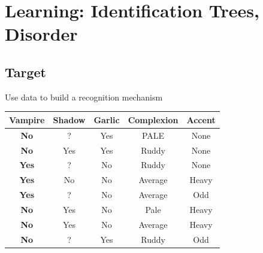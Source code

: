 \documentclass[12pt]{book}
\begin{document}
\section{Learning: Identification Trees, Disorder}
\subsection{Target}
Use data to build a recognition mechanism
\begin{table}[ht]
	\centering
	\begin{tabular}{|c|c|c|c|c|}
		\hline
		\rowcolor[HTML]{C0C0C0} 
		{\color[HTML]{000000} \textbf{Vampire}} & {\color[HTML]{000000} \textbf{Shadow}} & {\color[HTML]{000000} \textbf{Garlic}} & {\color[HTML]{000000} \textbf{Complexion}} & {\color[HTML]{000000} \textbf{Accent}} \\ \hline
		{\color[HTML]{000000} \textbf{No}}      & {\color[HTML]{000000} ?}               & {\color[HTML]{000000} Yes}             & {\color[HTML]{000000} PALE}                & {\color[HTML]{000000} None}            \\ \hline
		\rowcolor[HTML]{FFFFFF} 
		{\color[HTML]{000000} \textbf{No}}      & {\color[HTML]{000000} Yes}             & {\color[HTML]{000000} Yes}             & {\color[HTML]{000000} Ruddy}               & {\color[HTML]{000000} None}            \\ \hline
		{\color[HTML]{000000} \textbf{Yes}}     & {\color[HTML]{000000} ?}               & {\color[HTML]{000000} No}              & {\color[HTML]{000000} Ruddy}               & {\color[HTML]{000000} None}            \\ \hline
		{\color[HTML]{000000} \textbf{Yes}}     & {\color[HTML]{000000} No}              & {\color[HTML]{000000} No}              & {\color[HTML]{000000} Average}             & {\color[HTML]{000000} Heavy}           \\ \hline
		{\color[HTML]{000000} \textbf{Yes}}     & {\color[HTML]{000000} ?}               & {\color[HTML]{000000} No}              & {\color[HTML]{000000} Average}             & {\color[HTML]{000000} Odd}             \\ \hline
		{\color[HTML]{000000} \textbf{No}}      & {\color[HTML]{000000} Yes}             & {\color[HTML]{000000} No}              & {\color[HTML]{000000} Pale}                & {\color[HTML]{000000} Heavy}           \\ \hline
		{\color[HTML]{000000} \textbf{No}}      & {\color[HTML]{000000} Yes}             & {\color[HTML]{000000} No}              & {\color[HTML]{000000} Average}             & {\color[HTML]{000000} Heavy}           \\ \hline
		{\color[HTML]{000000} \textbf{No}}      & {\color[HTML]{000000} ?}               & {\color[HTML]{000000} Yes}             & {\color[HTML]{000000} Ruddy}               & {\color[HTML]{000000} Odd}             \\ \hline
	\end{tabular}
\end{table}
\end{document}
